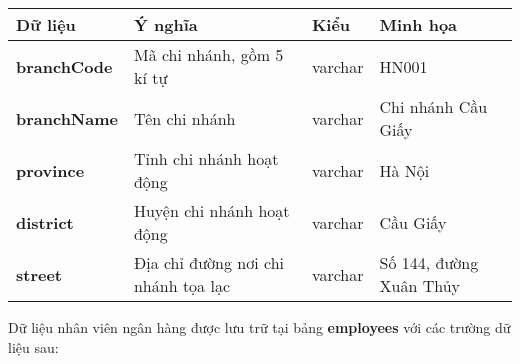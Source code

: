 \begin{center}
    \begin{tabular}{ | m{9em} | m{15em}| m{5em} | m{5em} | } 
    \hline
    \rowcolor{gray!30}
    Dữ liệu & Ý nghĩa & Kiểu & Minh họa \\ 

    \hline
    \textbf{branchCode} &
    Mã chi nhánh, gồm 5 kí tự &
    varchar &
    HN001 \\

    \hline
    \textbf{branchName} &
    Tên chi nhánh &
    varchar &
    Chi nhánh Cầu Giấy \\

    \hline
    \textbf{province} &
    Tỉnh chi nhánh hoạt động &
    varchar &
    Hà Nội \\

    \hline
    \textbf{district} &
    Huyện chi nhánh hoạt động &
    varchar &
    Cầu Giấy \\

    \hline
    \textbf{street} &
    Địa chỉ đường nơi chi nhánh tọa lạc &
    varchar &
    Số 144, đường Xuân Thủy \\

    \hline
    \end{tabular}
\end{center}




\noindent
Dữ liệu nhân viên ngân hàng được lưu trữ tại bảng \textbf{employees} với các trường dữ liệu sau:

\renewcommand{\arraystretch}{2} %
\setlength{\tabcolsep}{10pt}

